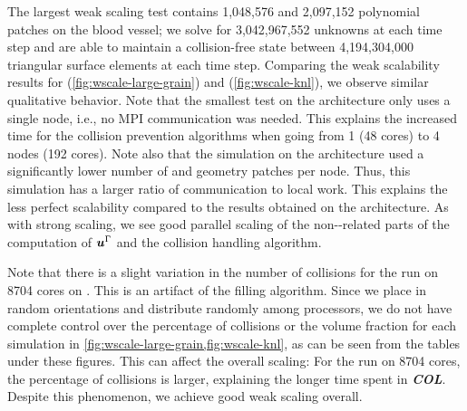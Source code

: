 The largest weak scaling test contains 1,048,576 \rbcs and 2,097,152 polynomial
patches on the blood vessel; we solve for 3,042,967,552 unknowns at each time
step and are able to maintain a collision-free state between
4,194,304,000 triangular surface elements at each time step.
Comparing the weak scalability results for 
(\cref{fig:wscale-large-grain}) and 
(\cref{fig:wscale-knl}), we observe similar qualitative
behavior. Note that the smallest test on the  architecture
only uses a single node, i.e., no MPI communication was needed. This
explains the increased time for the collision prevention algorithms when going
from 1 (48 cores) to 4 nodes (192 cores). 
Note also that the simulation on the  architecture
used a significantly lower number of \rbcs and geometry patches per
node. Thus, this simulation has a larger ratio of communication to
local work. This explains the less perfect scalability compared to
the results obtained on the  architecture.
As with strong scaling, we see good parallel scaling of the non-\fmm-related parts
of the computation of ${\bm{u}}^\Gamma$ and the collision handling algorithm.

Note that there is a slight variation in the number of collisions for
the run on 8704 cores on \knl.
This is an artifact of the \rbc filling algorithm.
Since we place \rbcs in random orientations and distribute \rbcs
randomly among processors, we do not have complete control over the percentage
of collisions or the volume fraction for each simulation in
\cref{fig:wscale-large-grain,fig:wscale-knl}, as can be seen from
the tables under these figures.
This can affect the overall scaling: For the run on 8704 cores, the
percentage of collisions is larger, explaining the longer
time spent in {\bf\em COL}.
Despite this phenomenon, we achieve good weak scaling overall.

